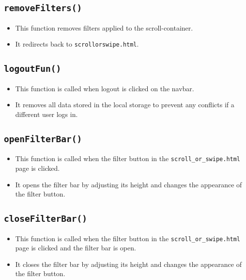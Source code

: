 \documentclass[12pt,a4paper]{article}
\begin{document}
\subsection{\texttt{removeFilters()}}
\begin{itemize}
    \item This function removes filters applied to the scroll-container.
    \item It redirects back to \texttt{scroll\textunderscore or\textunderscore swipe.html}.
\end{itemize}

\subsection{\texttt{logoutFun()}}
\begin{itemize}
    \item This function is called when logout is clicked on the navbar.
    \item It removes all data stored in the local storage to prevent any conflicts if a different user logs in.
\end{itemize}

\subsection{\texttt{openFilterBar()}}
\begin{itemize}
    \item This function is called when the filter button in the \texttt{scroll\_or\_swipe.html} page is clicked.
    \item It opens the filter bar by adjusting its height and changes the appearance of the filter button.
\end{itemize}

\subsection{\texttt{closeFilterBar()}}
\begin{itemize}
    \item This function is called when the filter button in the \texttt{scroll\_or\_swipe.html} page is clicked and the filter bar is open.
    \item It closes the filter bar by adjusting its height and changes the appearance of the filter button.
\end{itemize}
\end{document}
